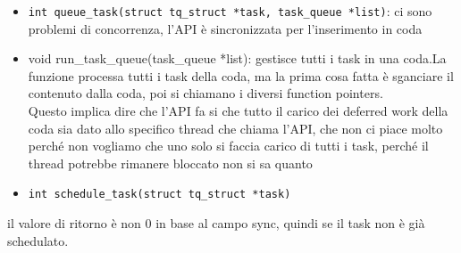 \documentclass[12pt, oneside]{extbook}
\begin{document}
\begin{itemize}
\item \texttt{int queue\_task(struct tq\_struct *task, task\_queue *list)}: ci sono problemi di concorrenza, l'API è sincronizzata per l'inserimento in coda
\item \textsf{void run\_task\_queue(task\_queue *list)}: gestisce tutti i task in una coda.La funzione processa tutti i task della coda, ma la prima cosa fatta è sganciare il contenuto dalla coda, poi si chiamano i diversi function pointers.\\Questo implica dire che l'API fa si che tutto il carico dei deferred work della coda sia dato allo specifico thread che chiama l'API, che non ci piace molto perché non vogliamo che uno solo si faccia carico di tutti i task, perché il thread potrebbe rimanere bloccato non si sa quanto
\item \texttt{int schedule\_task(struct tq\_struct *task)}
\end{itemize}
il valore di ritorno è non 0 in base al campo sync, quindi se il task non è già schedulato.
\end{document}
